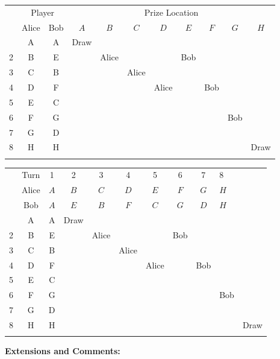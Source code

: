 \begin{table}[H]
	\centering
	\begin{tabular}{ccccccccccc}
		\myhline
		\multirow{2}{*}{Turn} & \multicolumn{2}{c}{Player} & \multicolumn{8}{c}{Prize Location}  \\
		 & Alice & Bob & $A$ & $B$ & $C$ & $D$ & $E$ & $F$ & $G$ & $H$  \\
		 \myhline
		 1 & A & A & Draw  &       &       &       &       &       &       &        \\
		 2 & B & E &       & Alice &       &       & Bob   &       &       &        \\
		 3 & C & B &       &       & Alice &       &       &       &       &        \\
		 4 & D & F &       &       &       & Alice &       & Bob   &       &        \\
		 5 & E & C &       &       &       &       &       &       &       &        \\
		 6 & F & G &       &       &       &       &       &       & Bob   &        \\
		 7 & G & D &       &       &       &       &       &       &       &        \\
		 8 & H & H &       &       &       &       &       &       &       & Draw   \\
		 \myhline
	\end{tabular}
\end{table}

\begin{table}[H]
	\centering
	\begin{tabular}{ccccccccc}
		\myhline
		& Turn  & 1   & 2   & 3   & 4   & 5   & 6   & 7   & 8    \\
		& Alice & $A$ & $B$ & $C$ & $D$ & $E$ & $F$ & $G$ & $H$  \\
		& Bob   & $A$ & $E$ & $B$ & $F$ & $C$ & $G$ & $D$ & $H$  \\
		 & A & A & Draw  &       &       &       &       &       &       &        \\
		2 & B & E &       & Alice &       &       & Bob   &       &       &        \\
		3 & C & B &       &       & Alice &       &       &       &       &        \\
		4 & D & F &       &       &       & Alice &       & Bob   &       &        \\
		5 & E & C &       &       &       &       &       &       &       &        \\
		6 & F & G &       &       &       &       &       &       & Bob   &        \\
		7 & G & D &       &       &       &       &       &       &       &        \\
		8 & H & H &       &       &       &       &       &       &       & Draw   \\
		\myhline
	\end{tabular}
\end{table}

\textbf{Extensions and Comments:}

